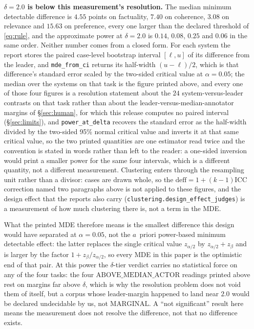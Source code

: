 \documentclass{article}
\newcommand{\ids}[1]{\texttt{\small #1}} %
\begin{document}
\textbf{$\delta = 2.0$ is below this measurement's resolution.} The median minimum detectable difference is $4.55$ points on factuality, $7.40$ on coherence, $3.08$ on relevance and $15.63$ on preference, every one larger than the declared threshold of \eqref{eq:rule}, and the approximate power at $\delta = 2.0$ is $0.14$, $0.08$, $0.25$ and $0.06$ in the same order. Neither number comes from a closed form. For each system the report stores the paired case-level bootstrap interval $[\ell,u]$ of its difference from the leader, and \ids{mde\_from\_ci} returns its half-width $(u-\ell)/2$, which is that difference's standard error scaled by the two-sided critical value at $\alpha = 0.05$; the median over the systems on that task is the figure printed above, and every one of those four figures is a resolution statement about the $24$ system-versus-leader contrasts on that task rather than about the leader-versus-median-annotator margins of \S\ref{sec:human}, for which this release computes no paired interval (\S\ref{sec:limits}), and \ids{power\_at\_delta} recovers the standard error as the half-width divided by the two-sided 95\% normal critical value and inverts it at that same critical value, so the two printed quantities are one estimator read twice and the convention is stated in words rather than left to the reader: a one-sided inversion would print a smaller power for the same four intervals, which is a different quantity, not a different measurement. Clustering enters through the resampling unit rather than a divisor: cases are drawn whole, so the $\mathrm{deff} = 1+(k-1)\mathrm{ICC}$ correction named two paragraphs above is not applied to these figures, and the design effect that the reports also carry (\texttt{clustering.design\_effect\_judges}) is a measurement of how much clustering there is, not a term in the MDE. 

What the printed MDE therefore means is the smallest difference this design would have separated at $\alpha = 0.05$, not the $a$~priori power-based minimum detectable effect: the latter replaces the single critical value $z_{\alpha/2}$ by $z_{\alpha/2} + z_{\beta}$ and is larger by the factor $1 + z_{\beta}/z_{\alpha/2}$, so every MDE in this paper is the optimistic end of that pair. At this power the $\delta$-tier verdict carries no statistical force on any of the four tasks: the four $\mathrm{ABOVE\_MEDIAN\_ACTOR}$ readings printed above rest on margins far above $\delta$, which is why the resolution problem does not void them of itself, but a corpus whose leader-margin happened to land near $2.0$ would be declared undecidable by us, not $\mathrm{MARGINAL}$. A ``not significant'' result here means the measurement does not resolve the difference, not that no difference exists.
\end{document}

